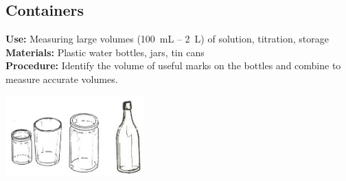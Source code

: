 \begin{multicols}{2}


\section{Containers}
\label{sec:containers}
\vspace{-10pt}
\textbf{Use:} Measuring large volumes (100~mL -- 2~L) of solution, titration, storage\\
\textbf{Materials:} Plastic water bottles, jars, tin cans\\
\textbf{Procedure:} Identify the volume of useful marks on the bottles 
and combine to measure accurate volumes.
\begin{center}
\includegraphics[width=0.4\textwidth]{./img/source/volumetric.jpg}
\end{center}


\end{multicols}
